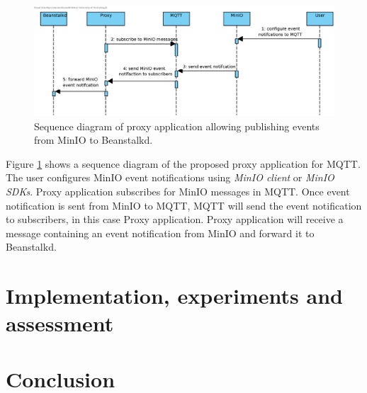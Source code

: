     \begin{figure}[H]
        \centering
        \includegraphics[angle=90,height=0.78\textheight]{obrazky-figures/minio-proxy.eps}
        \caption{Sequence diagram of proxy application allowing publishing events from MinIO to Beanstalkd.}
        \label{fig:minioProxy}
    \end{figure}

    Figure \ref{fig:minioProxy} shows a sequence diagram of the proposed proxy application for MQTT. The user configures MinIO event notifications using \textit{MinIO client} or \textit{MinIO SDKs}. Proxy application subscribes for MinIO messages in MQTT. Once event notification is sent from MinIO to MQTT, MQTT will send the event notification to subscribers, in this case Proxy application. Proxy application will receive a message containing an event notification from MinIO and forward it to Beanstalkd.


\chapter{Implementation, experiments and assessment}

\chapter{Conclusion}

